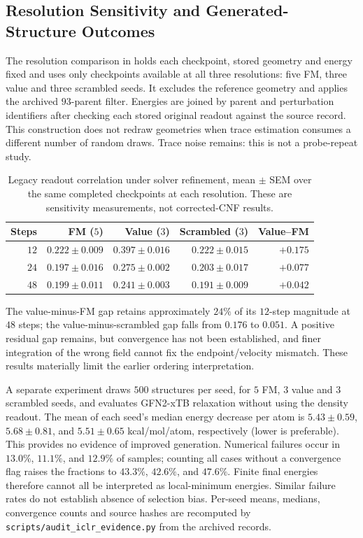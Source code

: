 \subsection{Resolution Sensitivity and Generated-Structure Outcomes}
\label{sec:auditresults}

The resolution comparison in  holds each checkpoint, stored geometry and
energy fixed and uses only checkpoints available at all three resolutions: five FM, three value and
three scrambled seeds. It excludes the reference geometry and applies the archived $93$-parent
filter. Energies are joined by parent and perturbation identifiers after checking each stored
original readout against the source record. This construction does not redraw geometries when trace
estimation consumes a different number of random draws. Trace noise remains: this is not a
probe-repeat study.

\begin{table}[t]
\centering\small
\caption{Legacy readout correlation under solver refinement, mean $\pm$ SEM over the same completed
checkpoints at each resolution. These are sensitivity measurements, not corrected-CNF results.}
\label{tab:auditresolution}
\begin{tabular}{rrrrr}
\toprule
Steps & FM ($5$) & Value ($3$) & Scrambled ($3$) & Value--FM \\
\midrule
$12$ & $0.222\pm0.009$ & $0.397\pm0.016$ & $0.222\pm0.015$ & $+0.175$ \\
$24$ & $0.197\pm0.016$ & $0.275\pm0.002$ & $0.203\pm0.017$ & $+0.077$ \\
$48$ & $0.199\pm0.011$ & $0.241\pm0.003$ & $0.191\pm0.009$ & $+0.042$ \\
\bottomrule
\end{tabular}
\end{table}

The value-minus-FM gap retains approximately $24\%$ of its $12$-step magnitude at $48$ steps;
the value-minus-scrambled gap falls from $0.176$ to $0.051$. A positive residual gap remains, but
convergence has not been established, and finer integration of the wrong field cannot fix the
endpoint/velocity mismatch. These results materially limit the earlier ordering interpretation.

A separate experiment draws $500$ structures per seed, for $5$ FM, $3$ value and $3$ scrambled
seeds, and evaluates GFN2-xTB relaxation without using the density readout. The mean of each seed's
median energy decrease per atom is $5.43\pm0.59$, $5.68\pm0.81$, and $5.51\pm0.65$
kcal/mol/atom, respectively (lower is preferable). This provides no evidence of improved generation.
Numerical failures occur in $13.0\%$, $11.1\%$, and $12.9\%$ of samples; counting all cases without
a convergence flag raises the fractions to $43.3\%$, $42.6\%$, and $47.6\%$. Finite final energies
therefore cannot all be interpreted as local-minimum energies. Similar failure rates do not establish
absence of selection bias. Per-seed means, medians, convergence counts and source hashes are
recomputed by \texttt{scripts/audit\_iclr\_evidence.py} from the archived records.
